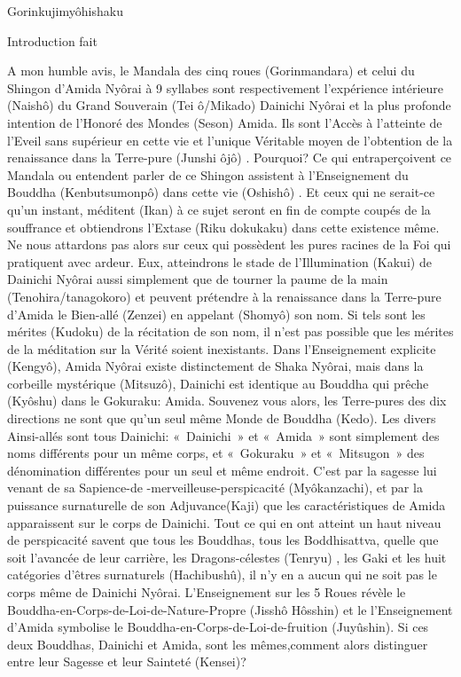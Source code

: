 Gorinkujimyôhishaku


Introduction fait

A mon humble avis, le Mandala des cinq roues (Gorinmandara)  et celui du Shingon d'Amida Nyôrai à 9 syllabes sont respectivement l'expérience intérieure (Naishô)  du Grand Souverain (Tei ô/Mikado)  Dainichi Nyôrai et la plus profonde intention de l'Honoré des Mondes (Seson) Amida. Ils sont l'Accès à l'atteinte de l'Eveil sans supérieur en cette vie et l'unique Véritable moyen de l'obtention de la renaissance dans la Terre-pure (Junshi ôjô) .
Pourquoi? Ce qui entraperçoivent ce Mandala ou entendent parler de ce Shingon assistent à l'Enseignement du Bouddha (Kenbutsumonpô) dans cette vie (Oshishô) . Et ceux qui ne serait-ce qu'un instant, méditent (Ikan) à ce sujet seront en fin de compte coupés de la souffrance et obtiendrons l'Extase (Riku dokukaku) dans cette existence même. Ne nous attardons pas alors sur ceux qui possèdent les pures racines de la Foi qui pratiquent avec ardeur. Eux, atteindrons le stade de l'Illumination (Kakui)  de Dainichi Nyôrai aussi simplement que de tourner la paume de la main (Tenohira/tanagokoro) et peuvent prétendre à la renaissance dans la Terre-pure d’Amida le Bien-allé (Zenzei) en appelant (Shomyô) son nom. Si tels sont les mérites (Kudoku)  de la récitation de son nom, il n'est pas possible que les mérites de la méditation sur la Vérité soient inexistants.
Dans l'Enseignement explicite (Kengyô), Amida Nyôrai existe distinctement de Shaka Nyôrai, mais dans la corbeille mystérique (Mitsuzô), Dainichi est identique au Bouddha qui prêche (Kyôshu) dans le Gokuraku: Amida.
Souvenez vous alors, les Terre-pures des dix directions ne sont que qu'un seul même Monde de Bouddha (Kedo). Les divers Ainsi-allés sont tous Dainichi: « Dainichi » et « Amida » sont simplement des noms différents pour un même corps, et « Gokuraku » et « Mitsugon » des dénomination différentes pour un seul et même endroit.
C'est par la sagesse lui venant de sa Sapience-de -merveilleuse-perspicacité (Myôkanzachi), et par la puissance surnaturelle de son Adjuvance(Kaji) que les caractéristiques de Amida apparaissent sur le corps de Dainichi. Tout ce qui en ont atteint un haut niveau de perspicacité savent que tous les Bouddhas, tous les Boddhisattva, quelle que soit l'avancée de leur carrière, les Dragons-célestes (Tenryu) , les Gaki et les huit catégories d'êtres surnaturels (Hachibushû), il n'y en a aucun qui ne soit pas le corps même de Dainichi Nyôrai.
L'Enseignement sur les 5 Roues révèle le Bouddha-en-Corps-de-Loi-de-Nature-Propre (Jisshô Hôsshin)  et le l'Enseignement d'Amida symbolise le Bouddha-en-Corps-de-Loi-de-fruition (Juyûshin). Si ces deux Bouddhas, Dainichi et Amida, sont les mêmes,comment alors distinguer entre leur Sagesse et leur Sainteté (Kensei)?
